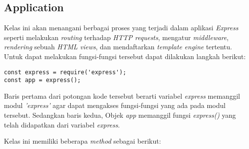 \subsection{Application}
Kelas ini akan menangani berbagai proses yang terjadi dalam aplikasi \textit{Express} seperti melakukan \textit{routing} terhadap \textit{HTTP requests}, mengatur \textit{middleware}, \textit{rendering} sebuah \textit{HTML views}, dan mendaftarkan \textit{template engine} tertentu. Untuk dapat melakukan fungsi-fungsi tersebut dapat dilakukan langkah berikut:

\begin{lstlisting}
const express = require('express');
const app = express();
\end{lstlisting}

Baris pertama dari potongan kode tersebut berarti variabel \textit{express} memanggil modul \textit{'express'} agar dapat mengakses fungsi-fungsi yang ada pada modul tersebut. Sedangkan baris kedua, Objek \textit{app} memanggil fungsi \textit{express()} yang telah didapatkan dari variabel \textit{express}.

Kelas ini memiliki beberapa \textit{method} sebagai berikut:

